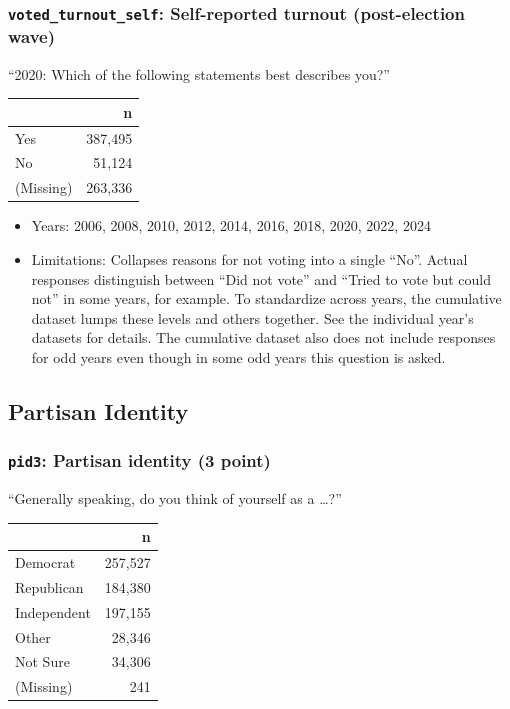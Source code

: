 \documentclass[10pt,article,oneside]{memoir}
\begin{document}
\subsubsection{\texorpdfstring{\texttt{voted\_turnout\_self}:
Self-reported turnout (post-election
wave)}{voted\_turnout\_self: Self-reported turnout (post-election wave)}}\label{voted_turnout_self-self-reported-turnout-post-election-wave}

``2020: Which of the following statements best describes you?''

\begin{table}[H]
\centering
\begin{tabular}[t]{lr}
\toprule
 & n\\
\midrule
Yes & 387,495\\
No & 51,124\\
(Missing) & 263,336\\
\bottomrule
\end{tabular}
\end{table}

\begin{itemize}
\tightlist
\item
  Years: 2006, 2008, 2010, 2012, 2014, 2016, 2018, 2020, 2022, 2024
\item
  Limitations: Collapses reasons for not voting into a single ``No''.
  Actual responses distinguish between ``Did not vote'' and ``Tried to
  vote but could not'' in some years, for example. To standardize across
  years, the cumulative dataset lumps these levels and others together.
  See the individual year's datasets for details. The cumulative dataset
  also does not include responses for odd years even though in some odd
  years this question is asked.
\end{itemize}

\subsection{Partisan Identity}\label{partisan-identity}

\subsubsection{\texorpdfstring{\texttt{pid3}: Partisan identity (3
point)}{pid3: Partisan identity (3 point)}}\label{pid3-partisan-identity-3-point}

``Generally speaking, do you think of yourself as a \ldots?''

\begin{table}[H]
\centering
\begin{tabular}[t]{lr}
\toprule
 & n\\
\midrule
Democrat & 257,527\\
Republican & 184,380\\
Independent & 197,155\\
Other & 28,346\\
Not Sure & 34,306\\
(Missing) & 241\\
\bottomrule
\end{tabular}
\end{table}
\end{document}
